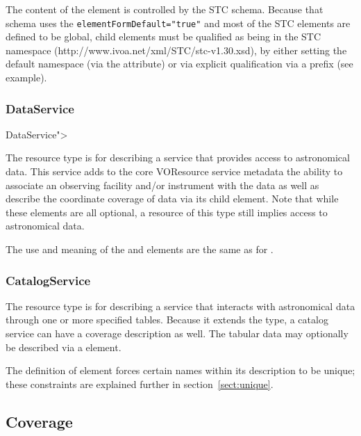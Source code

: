 \documentclass[11pt,a4paper]{ivoa}
\begin{document}
The content of the  element is
controlled by the STC schema.  Because that schema uses the 
\verb|elementFormDefault="true"| and most of the STC elements
are defined to be global,
 child elements must be qualified
as being in the STC namespace
(http://www.ivoa.net/xml/STC/stc-v1.30.xsd), by either setting the 
default namespace (via the  attribute) or via
explicit qualification via a prefix (see example).  


\subsubsection{DataService}
DataService">


The  resource type is for describing a
service that provides access to astronomical data.  This service adds
to the core VOResource service metadata the ability to associate an
observing facility and/or instrument with the data as well as describe
the coordinate coverage of data via its child 
element.  Note that while these elements are all optional, a resource
of this type still implies access to astronomical data.



The use and meaning of the  and
 elements are the same as for
.



\subsubsection{CatalogService}
\label{sect:catalogservice}


The  resource type is for describing a
service that interacts with astronomical data through one or more
specified tables.  Because it extends the 
type, a catalog service can have a coverage description as well.  The
tabular data may optionally be described via a
 element.




The definition of  element forces certain
names within its description to be unique; these constraints are explained
further in section~\ref{sect:unique}.

\subsection{Coverage}
\label{sect:cover}
\end{document}
